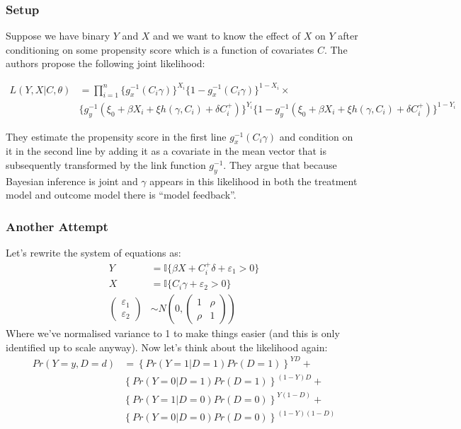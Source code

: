 \documentclass{article}
\begin{document}
  
\subsubsection*{Setup}
Suppose we have binary $Y$ and $X$ and we want to know the effect of $X$ on $Y$ 
after conditioning on some propensity score which is a function of covariates 
$C$. The authors propose the following joint likelihood:

\begin{align*}
    L(Y, X | C, \theta) &= \prod^n_{i = 1} \{
        g_x^{-1}(C_i \gamma)\}^{X_i} \{
            1 - g_x^{-1}(C_i\gamma)\}^{1 - X_i} \times \\
            &\{
                g_y^{-1}(\xi_0 + \beta X_i + \xi h(\gamma, C_i) + \delta C^+_i)
                \}^{Y_i} 
                \{1 -
                g_y^{-1}(\xi_0 + \beta X_i + \xi h(\gamma, C_i) + \delta C^+_i)
                \}^{1 - Y_i} 
\end{align*}

They estimate the propensity score in the first line $g_x^{-1}(C_i\gamma)$ and 
condition on it in the second line by adding it as a covariate in the mean vector 
that is subsequently transformed by the link function $g_y^{-1}$.
They argue that because Bayesian inference is joint and $\gamma$ appears in this likelihood in both the treatment 
model and outcome model there is ``model feedback''.

\subsubsection*{Another Attempt}

Let's rewrite the system of equations as:
\begin{align*}
    Y &= \mathbb{I}\{\beta X +  C_i^+ \delta + \varepsilon_1 > 0\} \\
    X &= \mathbb{I}\{ C_i\gamma + \varepsilon_2 > 0 \} \\
    \begin{pmatrix}
        \varepsilon_1 \\
        \varepsilon_2
    \end{pmatrix} &\sim N\left(0, \begin{pmatrix}
        1 & \rho \\
        \rho & 1
    \end{pmatrix}\right)
\end{align*}
Where we've normalised variance to 1 to make things easier (and this is only 
identified up to scale anyway). Now let's think about the likelihood again:
\begin{align*}
    Pr(Y = y, D = d) &= \left\{
        Pr(Y = 1 | D = 1) Pr(D = 1)
    \right\}^{YD} + \\
&\left\{
        Pr(Y = 0 | D = 1) Pr(D = 1)
    \right\}^{(1 -Y)D} + \\
&\left\{
        Pr(Y = 1 | D = 0) Pr(D = 0)
    \right\}^{Y(1 - D)} + \\
&\left\{
        Pr(Y = 0 | D = 0) Pr(D = 0)
    \right\}^{(1 -Y)(1 - D)} 
\end{align*}
\end{document}
